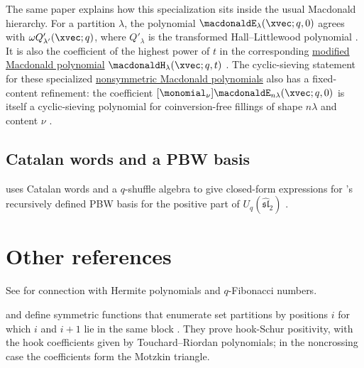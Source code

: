 The same paper explains how this specialization sits inside the usual
Macdonald hierarchy.  For a partition $\lambda$, the polynomial
$\macdonaldE_\lambda(\xvec;q,0)$ agrees with
$\omega Q'_{\lambda'}(\xvec;q)$, where $Q'_\lambda$ is the transformed
Hall--Littlewood polynomial \cite[Prop.~2.16]{AlexanderssonUhlin2020}.
It is also the coefficient of the highest power of $t$ in the corresponding
\hyperref[macdonaldH]{modified Macdonald polynomial}
$\macdonaldH_\lambda(\xvec;q,t)$
\cite[Sec.~2.8]{AlexanderssonUhlin2020}.  The cyclic-sieving statement for these specialized
\hyperref[macdonaldE]{nonsymmetric Macdonald polynomials} also has a fixed-content
refinement: the coefficient
$[\monomial_\nu]\macdonaldE_{n\lambda}(\xvec;q,0)$ is itself a
cyclic-sieving polynomial for coinversion-free fillings of shape $n\lambda$
and content $\nu$ \cite[Thm.~4.3]{AlexanderssonUhlin2020}.


\subsection[aoPBWBasis]{Catalan words and a PBW basis}

 uses Catalan words and a $q$-shuffle algebra to give
closed-form expressions for 's recursively defined PBW
basis for the positive part of $U_q(\widehat{\mathfrak{sl}}_2)$
\cite{Terwilliger2019}.

\section[aoOther]{Other references}

See \cite{CiglerZeng2011} for connection with Hermite polynomials and $q$-Fibonacci numbers.

 and  define symmetric functions that
enumerate set partitions by positions $i$ for which $i$ and $i+1$ lie in the
same block \cite{BagnoGarber2026x}.  They prove hook-Schur positivity, with
the hook coefficients given by Touchard--Riordan polynomials; in the
noncrossing case the coefficients form the Motzkin triangle.

